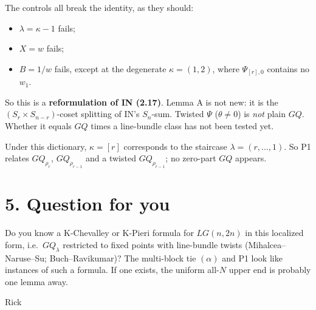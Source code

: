\documentclass[10pt]{article}
\begin{document}
The controls all break the identity, as they should:
\begin{itemize}
\item $\lambda=\kappa-1$ fails;
\item $X=w$ fails;
\item $B=1/w$ fails, except at the degenerate $\kappa=(1,2)$, where $\Psi_{[r],0}$ contains no $w_1$.
\end{itemize}

So this is a \textbf{reformulation of IN (2.17)}. Lemma A is not new: it is the $(S_r\times S_{n-r})$-coset splitting of IN's $S_n$-sum.
Twisted $\Psi$ ($\theta\ne0$) is \emph{not} plain $GQ$. Whether it equals $GQ$ times a line-bundle class has not been tested yet.

Under this dictionary, $\kappa=[r]$ corresponds to the staircase $\lambda=(r,\dots,1)$. So P1 relates $GQ_{\rho_r}$, $GQ_{\rho_{r-1}}$ and a twisted
$GQ_{\rho_{r-1}}$; no zero-part $GQ$ appears.

\section*{5. Question for you}
Do you know a K-Chevalley or K-Pieri formula for $LG(n,2n)$ in this localized form, i.e.\ $GQ_\lambda$ restricted to fixed points with
line-bundle twists (Mihalcea--Naruse--Su; Buch--Ravikumar)? The multi-block tie $(\alpha)$ and P1 look like instances of such a formula. If one exists, the
uniform all-$N$ upper end is probably one lemma away.

\medskip
Rick
\end{document}
